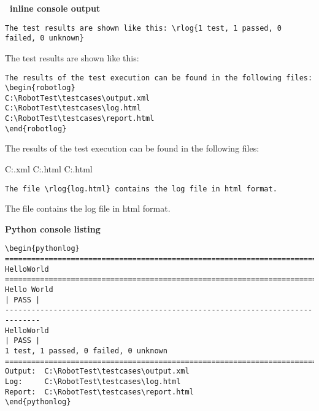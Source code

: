 \documentclass[a4paper,10pt]{report}
\begin{document}
\vspace{2ex}

\textbf{\rfw\ inline console output}
\begin{verbatim}
The test results are shown like this: \rlog{1 test, 1 passed, 0 failed, 0 unknown}
\end{verbatim}

The test results are shown like this: 

\vspace{2ex}

\begin{verbatim}
The results of the test execution can be found in the following files:
\begin{robotlog}
C:\RobotTest\testcases\output.xml
C:\RobotTest\testcases\log.html
C:\RobotTest\testcases\report.html
\end{robotlog}
\end{verbatim}

The results of the test execution can be found in the following files:
\begin{robotlog}
C:\RobotTest\testcases\output.xml
C:\RobotTest\testcases\log.html
C:\RobotTest\testcases\report.html
\end{robotlog}

\vspace{2ex}

\begin{verbatim}
The file \rlog{log.html} contains the log file in html format.
\end{verbatim}

The file  contains the log file in html format.


\newpage

\textbf{Python console listing}

\begin{verbatim}
\begin{pythonlog}
==============================================================================
HelloWorld
==============================================================================
Hello World                                                           | PASS |
------------------------------------------------------------------------------
HelloWorld                                                            | PASS |
1 test, 1 passed, 0 failed, 0 unknown
==============================================================================
Output:  C:\RobotTest\testcases\output.xml
Log:     C:\RobotTest\testcases\log.html
Report:  C:\RobotTest\testcases\report.html
\end{pythonlog}
\end{verbatim}
\end{document}
